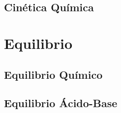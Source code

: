 \documentclass[
    11pt, %
    a4paper, %
]{LegrandOrangeBookES}
\begin{document}

    \chapter{Cinética Química}

    

    \newpage

    



    \part{Equilibrio}


    \chapterspaceabove{6.75cm} %
    \chapterspacebelow{7.25cm} %






    \chapter{Equilibrio Químico}

    

    \newpage

    


    


    \chapter{Equilibrio Ácido-Base}
\end{document}
